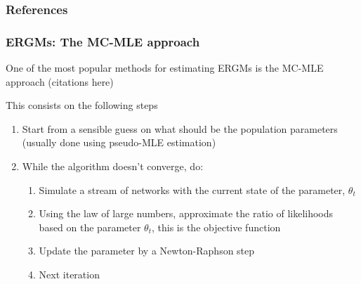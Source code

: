 \documentclass[aspectratio=169, 9pt]{beamer}\usepackage[]{graphicx}\usepackage[]{color}
\begin{document}
\begin{frame}
\maketitle
\begin{center}
\scalebox{2}{\textcolor{uscgold}{Thanks!}}
\end{center}
\end{frame}

\renewcommand{\section}[2]{}%
\appendix
\begin{frame}[allowframebreaks]
\frametitle{References}
% 
% 
\printbibliography
\end{frame}




\begin{frame}[label=mcmle]
\frametitle{ERGMs: The MC-MLE approach}

One of the most popular methods for estimating ERGMs is the MC-MLE approach (citations here)

This consists on the following steps

\begin{enumerate}
\item Start from a sensible guess on what should be the population parameters
(usually done using pseudo-MLE estimation)
\item While the algorithm doesn't converge, do:
  \begin{enumerate}
  \item Simulate a stream of networks with the current state of the parameter,
  $\theta_t$
  \item Using the law of large numbers, approximate the ratio of likelihoods 
  based on the parameter $\theta_t$, this is the objective function
  \item Update the parameter by a Newton-Raphson step
  \item Next iteration
  \end{enumerate}
\end{enumerate}

\vfill\hfill \hyperlink{art}{}


\end{frame}
\end{document}
